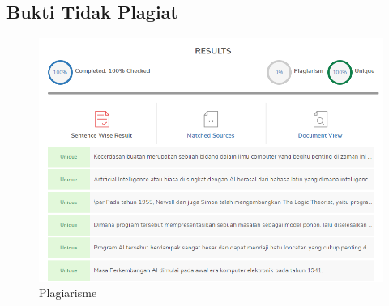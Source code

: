 \subsection{Bukti Tidak Plagiat}
	\begin{figure}[H]
		\centering
		\includegraphics[width=1\textwidth]{figures/1174057/chapter1/plagiat.png}
		\caption{Plagiarisme}
		\label{print}
	\end{figure}
